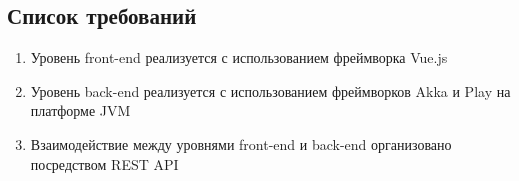 \documentclass[12pt, a4paper]{article}
\begin{document}
\subsection{Список требований}

\begin{enumerate}
\item Уровень front-end реализуется с использованием фреймворка Vue.js
\item Уровень back-end реализуется с использованием фреймворков Akka и Play
на платформе JVM
\item Взаимодействие между уровнями front-end и back-end организовано
посредством REST API

\end{enumerate}
\end{document}
